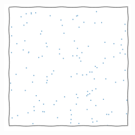 \documentclass[aspectratio=169]{beamer}
\begin{document}
\begin{frame}
\begin{columns}
        \includegraphics[width=0.5\textwidth,page=15]{figures/himmelblau}
    \end{columns}
\end{frame}
\end{document}
